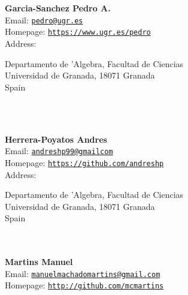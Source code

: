 \documentclass[a4paper,11pt]{report}
\newcommand{\logpage}[1]{\protect\write\pagenrlog{#1, \thepage,}}
\begin{document}
\begin{titlepage}
\mbox{}\\
{\mbox{}\\
\small \noindent \textbf{ Garcia-Sanchez Pedro A.\\
    }  Email: \href{mailto://pedro@ugr.es} {\texttt{pedro@ugr.es}}\\
  Homepage: \href{https://www.ugr.es/~pedro} {\texttt{https://www.ugr.es/\texttt{}pedro}}\\
  Address: \begin{minipage}[t]{8cm}\noindent
 Departamento de {\a'A}lgebra, Facultad de Ciencias\\
 Universidad de Granada, 18071 Granada\\
 Spain\\
 \end{minipage}
}\\
{\mbox{}\\
\small \noindent \textbf{ Herrera-Poyatos Andres\\
    }  Email: \href{mailto://andreshp99@gmailcom} {\texttt{andreshp99@gmailcom}}\\
  Homepage: \href{https://github.com/andreshp} {\texttt{https://github.com/andreshp}}\\
  Address: \begin{minipage}[t]{8cm}\noindent
 Departamento de {\a'A}lgebra, Facultad de Ciencias\\
 Universidad de Granada, 18071 Granada\\
 Spain\\
 \end{minipage}
}\\
{\mbox{}\\
\small \noindent \textbf{ Martins Manuel\\
   }  Email: \href{mailto://manuelmachadomartins@gmail.com} {\texttt{manuelmachadomartins@gmail.com}}\\
  Homepage: \href{http://github.com/mcmartins} {\texttt{http://github.com/mcmartins}}}\\
\end{titlepage}

\newpage\setcounter{page}{2}
\newpage

\def\contentsname{Contents\logpage{[ 0, 0, 1 ]}}

\tableofcontents
\newpage

     
\end{document}
